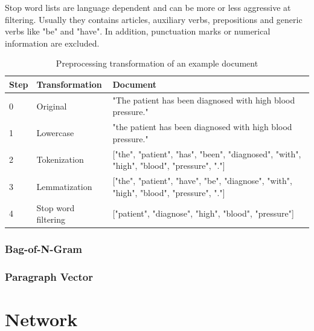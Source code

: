 Stop word lists are language dependent and can be more or less aggressive at filtering.
Usually they contains articles, auxiliary verbs, prepositions and generic verbs like "be" and "have".
In addition, punctuation marks or numerical information are excluded.

\begin{table}[]
	\begin{tabularx}{\textwidth}{l l p{9.8cm}}
		\toprule
		\textbf{Step} & \textbf{Transformation} & \textbf{Document}                                                       \\ \midrule
		0             & Original       & "The patient has been diagnosed with high blood pressure." \\
		1             & Lowercase               & "the patient has been diagnosed with high blood pressure." \\
		2 & Tokenization  & {[}"the", "patient", "has", "been", "diagnosed", "with", "high", "blood", "pressure", "."{]} \\
		3 & Lemmatization & {[}"the", "patient", "have", "be", "diagnose", "with", "high", "blood", "pressure", "."{]}   \\
		4             & Stop word filtering     & {[}"patient", "diagnose", "high", "blood", "pressure"{]} \\ \bottomrule
	\end{tabularx}
	\caption{Preprocessing transformation of an example document}
	\label{tab:text-preprocessing}
\end{table}








\subsubsection{Bag-of-N-Gram}
\subsubsection{Paragraph Vector}

\section{Network}